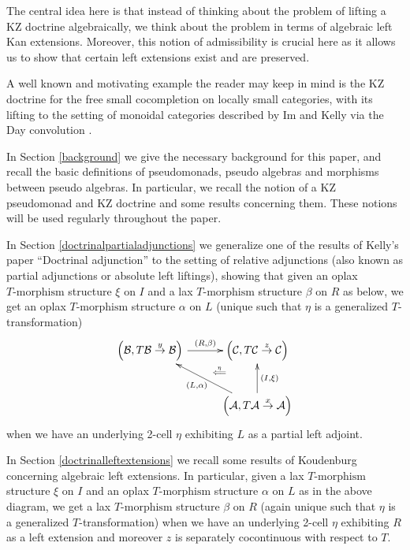 \documentclass[a4paper,oneside,english]{amsart}
\numberwithin{equation}{section}
\numberwithin{figure}{section}
\theoremstyle{plain}
\theoremstyle{definition}
\theoremstyle{remark}
\theoremstyle{definition}
\theoremstyle{plain}
\theoremstyle{plain}
\theoremstyle{plain}
\begin{document}
The central idea here is that instead of thinking about the problem
of lifting a KZ doctrine algebraically, we think about the problem
in terms of algebraic left Kan extensions. Moreover, this notion of
admissibility is crucial here as it allows us to show that certain
left extensions exist and are preserved.

A well known and motivating example the reader may keep in mind is
the KZ doctrine for the free small cocompletion on locally small categories,
with its lifting to the setting of monoidal categories described by
Im and Kelly \cite{uniconvolution} via the Day convolution \cite{dayconvolution}.

In Section \ref{background} we give the necessary background for
this paper, and recall the basic definitions of pseudomonads, pseudo
algebras and morphisms between pseudo algebras. In particular, we
recall the notion of a KZ pseudomonad and KZ doctrine and some results
concerning them. These notions will be used regularly throughout the
paper.

In Section \ref{doctrinalpartialadjunctions} we generalize one of
the results of Kelly's paper ``Doctrinal adjunction'' \cite{doctrinal}
to the setting of relative adjunctions (also known as partial adjunctions
or absolute left liftings), showing that given an oplax $T\text{-morphism}$
structure $\xi$ on $I$ and a lax $T\text{-morphism}$ structure
$\beta$ on $R$ as below, we get an oplax $T\text{-morphism}$ structure
$\alpha$ on $L$ (unique such that $\eta$ is a generalized $T$-transformation)
\[
\xymatrix@=1em{\left(\mathcal{B},T\mathcal{B}\overset{y}{\rightarrow}\mathcal{B}\right){\ar^-{{\left(R,\beta\right)}}[{rr}]} &  & \left(\mathcal{C},T\mathcal{C}\overset{z}{\rightarrow}\mathcal{C}\right)\ar@{}[ld]|-{\stackrel{\eta}{\Longleftarrow}}\\
 & \;\\
 &  & \left(\mathcal{A},T\mathcal{A}\overset{x}{\rightarrow}\mathcal{A}\right)\ar[uu]_{\left(I,\xi\right)}\ar[uull]^{\left(L,\alpha\right)}
}
\]
when we have an underlying 2-cell $\eta$ exhibiting $L$ as a partial
left adjoint.

In Section \ref{doctrinalleftextensions} we recall some results of
Koudenburg \cite{roald2015} concerning algebraic left extensions.
In particular, given a lax $T\text{-morphism}$ structure $\xi$ on
$I$ and an oplax $T\text{-morphism}$ structure $\alpha$ on $L$
as in the above diagram, we get a lax $T\text{-morphism}$ structure
$\beta$ on $R$ (again unique such that $\eta$ is a generalized
$T$-transformation) when we have an underlying 2-cell $\eta$ exhibiting
$R$ as a left extension and moreover $z$ is separately cocontinuous
with respect to $T$. 
\end{document}
